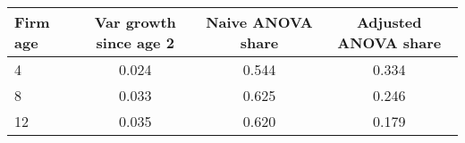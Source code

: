 \begin{tabular}{lccc}
Firm age & Var  growth since age 2 & Naive ANOVA share & Adjusted ANOVA share \\
\hline
4 &     0.024 &  0.544 &  0.334 \\
8 &     0.033 &  0.625 &  0.246 \\
12 &     0.035 &  0.620 &  0.179 \\
\end{tabular}

